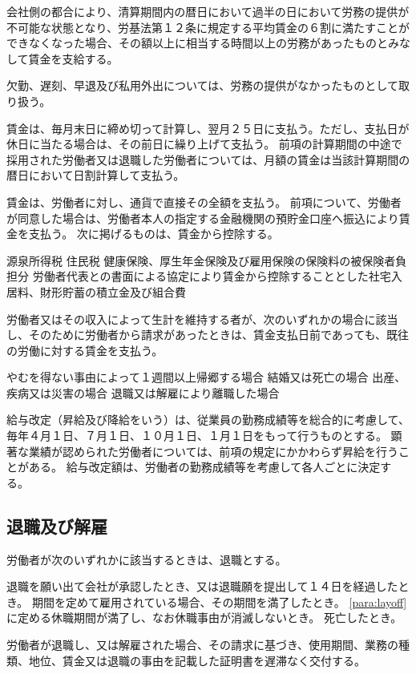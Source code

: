 \documentclass[10pt,a4paper,uplatex]{jsarticle}
\begin{document}
会社側の都合により、清算期間内の暦日において過半の日において労務の提供が不可能な状態となり、労基法第１２条に規定する平均賃金の６割に満たすことができなくなった場合、その額以上に相当する時間以上の労務があったものとみなして賃金を支給する。

欠勤、遅刻、早退及び私用外出については、労務の提供がなかったものとして取り扱う。

賃金は、毎月末日に締め切って計算し、翌月２５日に支払う。ただし、支払日が休日に当たる場合は、その前日に繰り上げて支払う。
\term
前項の計算期間の中途で採用された労働者又は退職した労働者については、月額の賃金は当該計算期間の暦日において日割計算して支払う。

賃金は、労働者に対し、通貨で直接その全額を支払う。
\term
前項について、労働者が同意した場合は、労働者本人の指定する金融機関の預貯金口座へ振込により賃金を支払う。
\term
次に掲げるものは、賃金から控除する。
\begin{enumerate}
    \itm 源泉所得税
    \itm 住民税
    \itm 健康保険、厚生年金保険及び雇用保険の保険料の被保険者負担分
    \itm 労働者代表との書面による協定により賃金から控除することとした社宅入居料、財形貯蓄の積立金及び組合費
\end{enumerate}

労働者又はその収入によって生計を維持する者が、次のいずれかの場合に該当し、そのために労働者から請求があったときは、賃金支払日前であっても、既往の労働に対する賃金を支払う。
\begin{enumerate}
    \itm やむを得ない事由によって１週間以上帰郷する場合
    \itm 結婚又は死亡の場合
    \itm 出産、疾病又は災害の場合
    \itm 退職又は解雇により離職した場合
\end{enumerate}

給与改定（昇給及び降給をいう）は、従業員の勤務成績等を総合的に考慮して、毎年４月１日、７月１日、１０月１日、１月１日をもって行うものとする。
\term
顕著な業績が認められた労働者については、前項の規定にかかわらず昇給を行うことがある。
\term
給与改定額は、労働者の勤務成績等を考慮して各人ごとに決定する。


\subsection{退職及び解雇}

労働者が次のいずれかに該当するときは、退職とする。
\begin{enumerate}
    \itm 退職を願い出て会社が承認したとき、又は退職願を提出して１４日を経過したとき。
    \itm 期間を定めて雇用されている場合、その期間を満了したとき。
    \itm \ref{para:layoff}に定める休職期間が満了し、なお休職事由が消滅しないとき。
    \itm 死亡したとき。
\end{enumerate}
\term
労働者が退職し、又は解雇された場合、その請求に基づき、使用期間、業務の種類、地位、賃金又は退職の事由を記載した証明書を遅滞なく交付する。
\end{document}
